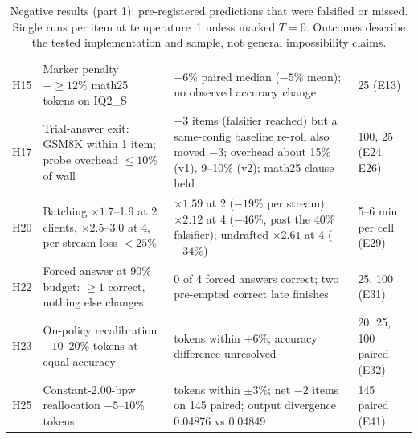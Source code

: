 \documentclass[11pt]{article}
\begin{document}
\begin{table}[p]
\begin{tabular}{L{0.85cm}L{5.0cm}L{6.95cm}L{3.05cm}}
H15 & Marker penalty $-\ge12\%$ math25 tokens on IQ2\_S & $-6\%$ paired median ($-5\%$ mean); no observed accuracy change & 25 (E13) \\
H17 & Trial-answer exit: GSM8K within 1 item; probe overhead $\le10\%$ of wall & $-3$ items (falsifier reached) but a same-config baseline re-roll also moved $-3$; overhead about 15\% (v1), 9--10\% (v2); math25 clause held & 100, 25 (E24, E26) \\
H20 & Batching $\times1.7$--1.9 at 2 clients, $\times2.5$--3.0 at 4, per-stream loss $<25\%$ & $\times1.59$ at 2 ($-19\%$ per stream); $\times2.12$ at 4 ($-46\%$, past the 40\% falsifier); undrafted $\times2.61$ at 4 ($-34\%$) & 5--6 min per cell (E29) \\
H22 & Forced answer at 90\% budget: $\ge1$ correct, nothing else changes & 0 of 4 forced answers correct; two pre-empted correct late finishes & 25, 100 (E31) \\
H23 & On-policy recalibration $-10$--$20\%$ tokens at equal accuracy & tokens within $\pm6\%$; accuracy difference unresolved & 20, 25, 100 paired (E32) \\
H25 & Constant-2.00-bpw reallocation $-5$--$10\%$ tokens & tokens within $\pm3\%$; net $-2$ items on 145 paired; output divergence 0.04876 vs 0.04849 & 145 paired (E41) \\
\bottomrule
\end{tabular}
\caption{Negative results (part 1): pre-registered predictions that were
falsified or missed. Single runs per item at temperature~1 unless marked
$T{=}0$. Outcomes describe the tested implementation and sample, not
general impossibility claims.}
\label{tab:negative}
\end{table}
\end{document}
